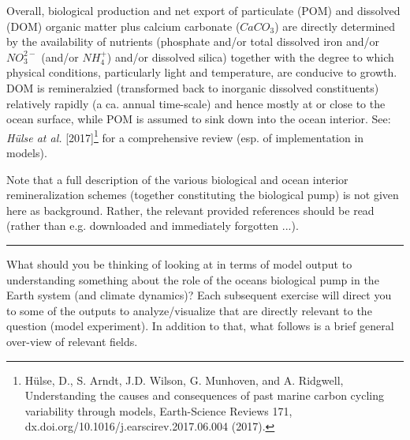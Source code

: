 Overall, biological production and net export of particulate (POM) and dissolved (DOM) organic matter plus calcium carbonate (\(CaCO_{3}\)) are directly determined by the availability of nutrients (phosphate and/or total dissolved iron and/or \(NO^{2-}_{3}\) (and/or \(NH^{+}_{4}\)) and/or dissolved silica) together with the degree to which physical conditions, particularly light and temperature, are conducive to growth. DOM is remineralzied (transformed back to inorganic dissolved constituents) relatively rapidly (a ca. annual time-scale) and hence mostly at or close to the ocean surface, while POM is assumed to sink down into the ocean interior. See: \textit{Hülse at al.} [2017]\footnote{Hülse, D., S. Arndt, J.D. Wilson, G. Munhoven, and A. Ridgwell, Understanding the causes and consequences of past marine carbon cycling variability through models, Earth-Science Reviews 171, dx.doi.org/10.1016/j.earscirev.2017.06.004 (2017).} for a comprehensive review (esp. of implementation in models).

Note that a full description of the various biological and ocean interior remineralization schemes (together constituting the biological pump) is not given here as background. Rather, the relevant provided references should be read (rather than e.g. downloaded and immediately forgotten ...).

\vspace{1mm}
\noindent\rule{4cm}{0.5pt}
\vspace{2mm}

\newpage

\noindent What should you be thinking of looking at in terms of model output to understanding something about the role of the oceans biological pump in the Earth system (and climate dynamics)? Each subsequent exercise will direct you to some of the outputs to analyze/visualize that are directly relevant to the question (model experiment). In addition to that, what follows is a brief general over-view of relevant fields.

